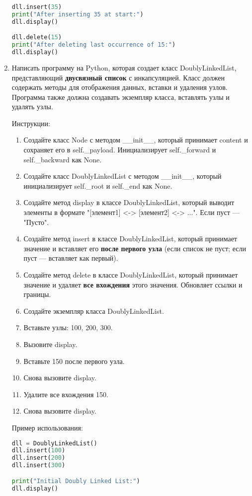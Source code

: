 \begin{enumerate}
\begin{lstlisting}[language=Python]
dll.insert(35)
print("After inserting 35 at start:")
dll.display()

dll.delete(15)
print("After deleting last occurrence of 15:")
dll.display()
\end{lstlisting}

\item Написать программу на Python, которая создает класс DoublyLinkedList, представляющий \textbf{двусвязный список} с инкапсуляцией. Класс должен содержать методы для отображения данных, вставки и удаления узлов. Программа также должна создавать экземпляр класса, вставлять узлы и удалять узлы.

Инструкции:
\begin{enumerate}
    \item Создайте класс Node с методом \_\_init\_\_, который принимает content и сохраняет его в self.\_payload. Инициализирует self.\_forward и self.\_backward как None.
    \item Создайте класс DoublyLinkedList с методом \_\_init\_\_, который инициализирует self.\_root и self.\_end как None.
    \item Создайте метод display в классе DoublyLinkedList, который выводит элементы в формате "[элемент1] <-> [элемент2] <-> ...". Если пуст — "Пусто".
    \item Создайте метод insert в классе DoublyLinkedList, который принимает значение и вставляет его \textbf{после первого узла} (если список не пуст; если пуст — вставляет как первый).
    \item Создайте метод delete в классе DoublyLinkedList, который принимает значение и удаляет \textbf{все вхождения} этого значения. Обновляет ссылки и границы.
    \item Создайте экземпляр класса DoublyLinkedList.
    \item Вставьте узлы: 100, 200, 300.
    \item Вызовите display.
    \item Вставьте 150 после первого узла.
    \item Снова вызовите display.
    \item Удалите все вхождения 150.
    \item Снова вызовите display.
\end{enumerate}

Пример использования:
\begin{lstlisting}[language=Python]
dll = DoublyLinkedList()
dll.insert(100)
dll.insert(200)
dll.insert(300)

print("Initial Doubly Linked List:")
dll.display()


\end{lstlisting}
\end{enumerate}
